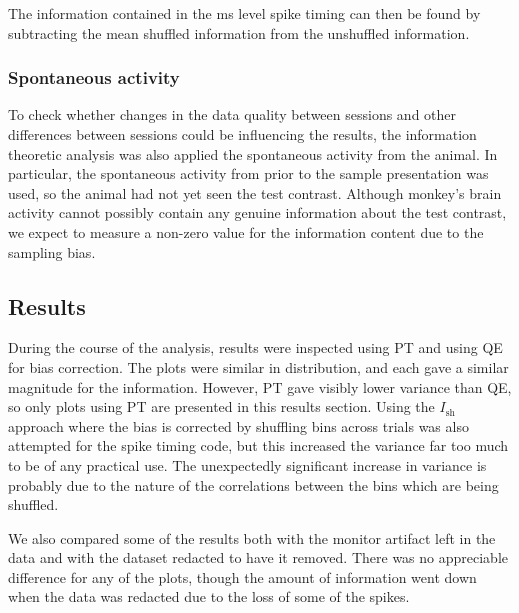 The information contained in the \unit[4]{ms} level spike timing can then be found by subtracting the mean shuffled information from the unshuffled information.

\FloatBarrier
\subsubsection{Spontaneous activity}

To check whether changes in the data quality between sessions and other differences between sessions could be influencing the results, the information theoretic analysis was also applied the spontaneous activity from the animal.
In particular, the spontaneous activity from prior to the sample presentation was used, so the animal had not yet seen the test contrast.
Although monkey's brain activity cannot possibly contain any genuine information about the test contrast, we expect to measure a non-zero value for the information content due to the sampling bias.

\subsection{Results}

During the course of the analysis, results were inspected using PT and using QE for bias correction. The plots were similar in distribution, and each gave a similar magnitude for the information. However, PT gave visibly lower variance than QE, so only plots using PT are presented in this results section.
Using the $I_{\text{sh}}$ approach where the bias is corrected by shuffling bins across trials \cite{Montemurro2007} was also attempted for the spike timing code, but this increased the variance far too much to be of any practical use. The unexpectedly significant increase in variance is probably due to the nature of the correlations between the bins which are being shuffled.

We also compared some of the results both with the monitor artifact left in the data and with the dataset redacted to have it removed. There was no appreciable difference for any of the plots, though the amount of information went down when the data was redacted due to the loss of some of the spikes.

